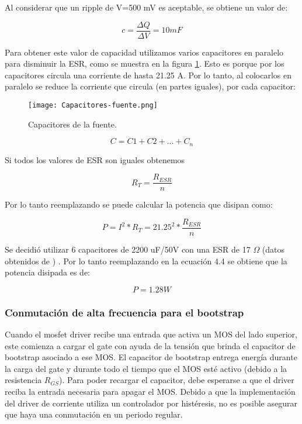 \noindent Al considerar que un ripple de V=500 mV es aceptable, se obtiene un valor de:

\begin{equation} 
	c = \frac{\Delta Q}{\Delta V} = 10 mF
\end{equation}

\noindent Para obtener este valor de capacidad utilizamos varios capacitores en paralelo para disminuir la ESR, como se muestra en la figura \ref{fig:img_capacitores-fuente}. Esto es porque por los capacitores circula una corriente de hasta 21.25 A. Por lo tanto, al colocarlos en paralelo se reduce la corriente que circula (en partes iguales), por cada capacitor:


\begin{figure}[H]
	\centering
	\texttt{[image: Capacitores-fuente.png]}
	\caption{Capacitores de la fuente.}
	\label{fig:img_capacitores-fuente}
\end{figure}


\begin{equation} 
	C = C1 + C2 + ... + C_n
\end{equation}


\noindent Si todos los valores de ESR son iguales obtenemos

\begin{equation} 
R_T = \frac{R_{ESR}}{n}
\end{equation}

\noindent Por lo tanto reemplazando se puede calcular la potencia que disipan como:

\begin{equation} 
	P = I^2 * R_T = 21.25^2 * \frac{R_{ESR}}{n}
\end{equation}

\noindent Se decidió utilizar 6 capacitores  de 2200 uF/50V con una ESR de 17 $\Omega$ (datos obtenidos de \cite{EKY-350ELL222MM25S}) . Por lo tanto reemplazando en la ecuación 4.4 se obtiene que la potencia disipada es de: 

\begin{equation} 
	P=1.28 W
\end{equation}


\subsubsection{Conmutación de alta frecuencia para el bootstrap}

\noindent Cuando el mosfet driver recibe una entrada que activa un MOS del lado superior, este comienza a cargar el gate con ayuda de la tensión que brinda el capacitor de bootstrap asociado a ese MOS. El capacitor de bootstrap entrega energía durante la carga del gate y durante todo el tiempo que el MOS esté activo (debido a la resistencia $R_{GS}$). Para poder recargar el capacitor, debe esperarse a que el driver reciba la entrada necesaria para apagar el MOS. Debido a que la implementación del driver de corriente utiliza un controlador por histéresis, no es posible asegurar que haya una conmutación en un periodo regular.


